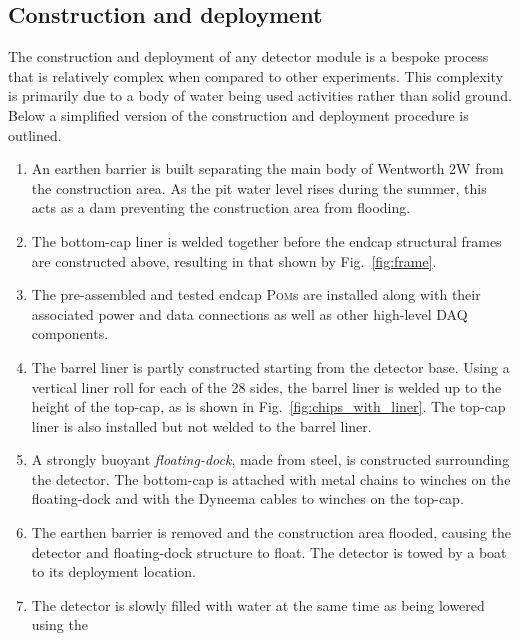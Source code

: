\subsection{Construction and deployment} %
\label{sec:chips_detector_deployment} %

The construction and deployment of any \chips detector module is a bespoke process that is
relatively complex when compared to other experiments. This complexity is primarily due to a body
of water being used activities rather than solid ground. Below a simplified version of the
\chipsfive construction and deployment procedure is outlined.

\begin{enumerate}
    \item An earthen barrier is built separating the main body of Wentworth 2W from the
          construction area. As the pit water level rises during the summer, this acts as a dam
          preventing the construction area from flooding.
    \item The bottom-cap liner is welded together before the endcap structural frames are
          constructed above, resulting in that shown by Fig.~\ref{fig:frame}.
    \item The pre-assembled and tested endcap \textsc{Pom}s are installed along with their
          associated power and data connections as well as other high-level DAQ components.
    \item The barrel liner is partly constructed starting from the detector base. Using a vertical
          liner roll for each of the 28 sides, the barrel liner is welded up to the height of the
          top-cap, as is shown in Fig.~\ref{fig:chips_with_liner}. The top-cap liner is also
          installed but not welded to the barrel liner.
    \item A strongly buoyant \emph{floating-dock}, made from steel, is constructed surrounding the
          detector. The bottom-cap is attached with metal chains to winches on the floating-dock
          and with the Dyneema cables to winches on the top-cap.
    \item The earthen barrier is removed and the construction area flooded, causing the detector
          and floating-dock structure to float. The detector is towed by a boat to its deployment
          location.
    \item The detector is slowly filled with water at the same time as being lowered using the

\end{enumerate}
